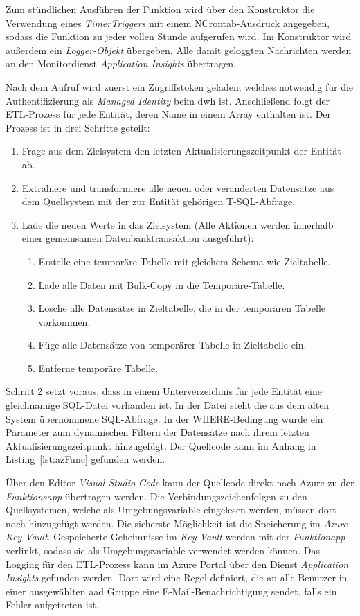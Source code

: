 Zum stündlichen Ausführen der Funktion wird über den Konstruktor die Verwendung eines \textit{TimerTriggers} mit einem NCrontab-Ausdruck angegeben, sodass die Funktion zu jeder vollen Stunde aufgerufen wird. Im Konstruktor wird außerdem ein \textit{Logger-Objekt} übergeben. Alle damit geloggten Nachrichten werden an den Monitordienst \textit{Application Insights} übertragen.

Nach dem Aufruf wird zuerst ein Zugriffstoken geladen, welches notwendig für die Authentifizierung als \textit{Managed Identity} beim \ac{dwh} ist. Anschließend folgt der ETL-Prozess für jede Entität, deren Name in einem Array enthalten ist. Der Prozess ist in drei Schritte geteilt:

\begin{enumerate}
\item Frage aus dem Zielsystem den letzten Aktualisierungszeitpunkt der Entität ab.
\item Extrahiere und transformiere alle neuen oder veränderten Datensätze aus dem Quellsystem mit der zur Entität gehörigen T-SQL-Abfrage.
\item Lade die neuen Werte in das Zielsystem (Alle Aktionen werden innerhalb einer gemeinsamen Datenbanktransaktion ausgeführt):
    \begin{enumerate}[label*=\arabic*.]
    \item Erstelle eine temporäre Tabelle mit gleichem Schema wie Zieltabelle.
    \item Lade alle Daten mit Bulk-Copy in die Temporäre-Tabelle.
    \item Lösche alle Datensätze in Zieltabelle, die in der temporären Tabelle vorkommen.
    \item Füge alle Datensätze von temporärer Tabelle in Zieltabelle ein.
    \item Entferne temporäre Tabelle.
    \end{enumerate}
\end{enumerate}
Schritt 2 setzt voraus, dass in einem Unterverzeichnis für jede Entität eine gleichnamige SQL-Datei vorhanden ist. In der Datei steht die aus dem alten System übernommene SQL-Abfrage. In der WHERE-Bedingung wurde ein Parameter zum dynamischen Filtern der Datensätze nach ihrem letzten Aktualisierungszeitpunkt hinzugefügt. Der Quellcode kann im Anhang in Listing~\ref{lst:azFunc} gefunden werden.

Über den Editor \textit{Visual Studio Code} kann der Quellcode direkt nach Azure zu der \textit{Funktionsapp} übertragen werden. Die Verbindungszeichenfolgen zu den Quellsystemen, welche als Umgebungsvariable eingelesen werden, müssen dort noch hinzugefügt werden. Die sicherste Möglichkeit ist die Speicherung im \textit{Azure Key Vault}. Gespeicherte Geheimnisse im \textit{Key Vault} werden mit der \textit{Funktionapp} verlinkt, sodass sie als Umgebungsvariable verwendet werden können. Das Logging für den ETL-Prozess kann im Azure Portal über den Dienst \textit{Application Insights} gefunden werden. Dort wird eine Regel definiert, die an alle Benutzer in einer ausgewählten \ac{aad} Gruppe eine E-Mail-Benachrichtigung sendet, falls ein Fehler aufgetreten ist.

